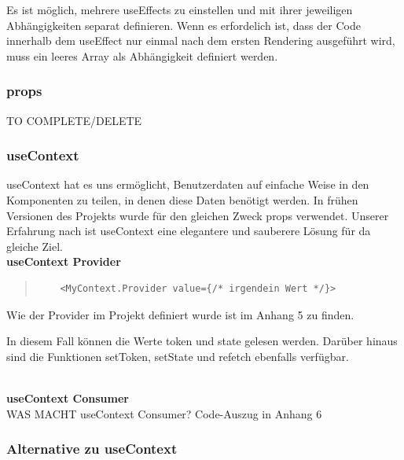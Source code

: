 \begin{flushleft}
  Es ist möglich, mehrere useEffects zu einstellen und mit ihrer jeweiligen Abhängigkeiten separat definieren.
  Wenn es erfordelich ist, dass der Code innerhalb dem useEffect nur einmal nach dem ersten Rendering ausgeführt wird, muss ein leeres Array als Abhängigkeit definiert werden.
\end{flushleft}

\subsubsection{props}
TO COMPLETE/DELETE
\subsubsection{useContext}
useContext hat es uns ermöglicht, Benutzerdaten auf einfache Weise in den Komponenten zu teilen, in denen diese Daten benötigt werden. In frühen Versionen des Projekts wurde für den gleichen Zweck props verwendet.
Unserer Erfahrung nach ist useContext eine elegantere und sauberere Lösung für da gleiche Ziel.
\\
\textbf{useContext Provider} \\
\begin{quote}
  \begin{lstlisting}
    <MyContext.Provider value={/* irgendein Wert */}>
    \end{lstlisting}
  {\cite{R02}}

\end{quote}
Wie der Provider im Projekt definiert wurde ist im Anhang 5 zu finden.

In diesem Fall können die Werte token und state gelesen werden. Darüber hinaus sind die Funktionen setToken, setState und refetch ebenfalls verfügbar.
\\\\
\newpage

\textbf{useContext Consumer} \\
WAS MACHT useContext Consumer?
Code-Auszug in Anhang 6



\subsubsection{Alternative zu useContext}
